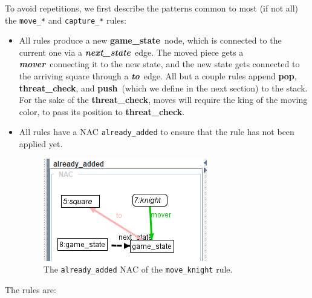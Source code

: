 \documentclass[a4paper, 10pt]{scrartcl}
\newcommand{\noderepr}[1]{\textsf{\textbf{#1}}}
\newcommand{\edgerepr}[1]{\textit{\textbf{#1}}}
\newcommand{\gamestate}{\noderepr{game\_state}}
\newcommand{\push}{\noderepr{push}}
\newcommand{\pop}{\noderepr{pop}}
\newcommand{\threatcheck}{\noderepr{threat\_check}}
\newcommand{\nextstate}{\edgerepr{next\_state}}
\newcommand{\mover}{\edgerepr{mover}}
\newcommand{\tosquare}{\edgerepr{to}}
\begin{document}
    To avoid repetitions, we first describe the patterns common to most (if not all) the \texttt{move\_*} and \texttt{capture\_*} rules:
    \begin{itemize}
        \item All rules produce a new \gamestate\ node, which is connected to the current one via a \nextstate\ edge. The moved piece gets a \mover\ connecting it to the new state, and the new state gets connected to the arriving square through a \tosquare\ edge. All but a couple rules append \pop, \threatcheck, and \push\ (which we define in the next section) to the stack.
        For the sake of the \threatcheck, moves will require the king of the moving color, to pass its position to \threatcheck.
        \item All rules have a NAC \texttt{already\_added} to ensure that the rule has not been applied yet.
        \begin{figure}[H]
            \centering
            \includegraphics[width=.5\linewidth]{images/already_added_move.png}
            \caption{The \texttt{already\_added} NAC of the \texttt{move\_knight} rule.}
        \end{figure}
    \end{itemize}
    The rules are:
\end{document}
